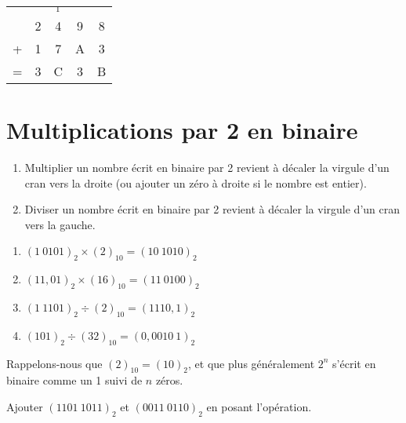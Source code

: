 \documentclass[a4paper,12pt,french]{book}
\begin{document}
\begin{exemple}
\begin{center}
\begin{tabular}{ccccc}
	&  & $_1$ &  &  \\
	& 2 & 4 & 9 & 8 \\
	+ & 1 & 7 & A & 3 \\
	\hline
=	& 3 & C & 3 & B \\
\end{tabular}
\end{center}
\end{exemple}

\section{Multiplications par 2 en binaire}

\begin{propriete}[]
	\begin{enumerate}[\textbullet]
		\item 	Multiplier un nombre écrit en binaire par 2 revient à décaler la virgule d'un cran vers la droite (ou ajouter un zéro à droite si le nombre est entier).
		\item 	Diviser un nombre écrit en binaire par 2 revient à décaler la virgule d'un cran vers la gauche.
	\end{enumerate}
\end{propriete}

\begin{exemple}[s]
	\begin{enumerate}[\textbullet]
		\item 	$(1\ 0101)_2\times (2)_{10}=(10\ 1010)_2$
		\item 	$(11,01)_2\times (16)_{10}=(11\ 0100)_2$
		\item 	$(1\ 1101)_2\div (2)_{10}=(1110,1)_2$
		\item 	$(101)_2\div (32)_{10}=(0,0010\ 1)_2$
	\end{enumerate}
\end{exemple}

\begin{remarque}
	Rappelons-nous que $(2)_{10}=(10)_2$, et que plus généralement $2^n$ s'écrit en binaire comme \og un 1 suivi de $n$ zéros\fg.
\end{remarque}

\exostart

\begin{exercice}[]
	Ajouter $(1101\ 1011)_2$ et $(0011\ 0110)_2$ en posant l'opération.
\end{exercice}
\end{document}
